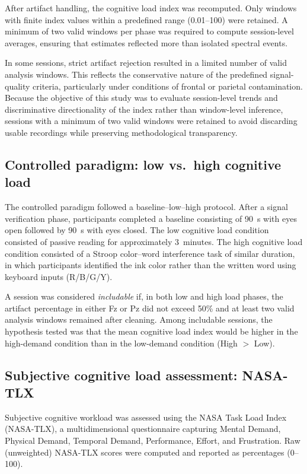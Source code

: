\documentclass[conference]{IEEEtran}
\begin{document}
After artifact handling, the cognitive load index was recomputed. Only windows with finite index values within a predefined range (0.01--100) were retained. A minimum of two valid windows per phase was required to compute session-level averages, ensuring that estimates reflected more than isolated spectral events.

In some sessions, strict artifact rejection resulted in a limited number of valid analysis windows. This reflects the conservative nature of the predefined signal-quality criteria, particularly under conditions of frontal or parietal contamination. Because the objective of this study was to evaluate session-level trends and discriminative directionality of the index rather than window-level inference, sessions with a minimum of two valid windows were retained to avoid discarding usable recordings while preserving methodological transparency.


\subsection{Controlled paradigm: low vs.\ high cognitive load}
The controlled paradigm followed a baseline--low--high protocol. After a signal verification phase, participants completed a baseline consisting of 90~s with eyes open followed by 90~s with eyes closed. The low cognitive load condition consisted of passive reading for approximately 3~minutes. The high cognitive load condition consisted of a Stroop color--word interference task of similar duration, in which participants identified the ink color rather than the written word using keyboard inputs (R/B/G/Y).

A session was considered \emph{includable} if, in both low and high load phases, the artifact percentage in either Fz or Pz did not exceed 50\% and at least two valid analysis windows remained after cleaning. Among includable sessions, the hypothesis tested was that the mean cognitive load index would be higher in the high-demand condition than in the low-demand condition (High $>$ Low).

\subsection{Subjective cognitive load assessment: NASA-TLX}
Subjective cognitive workload was assessed using the NASA Task Load Index (NASA-TLX), a multidimensional questionnaire capturing Mental Demand, Physical Demand, Temporal Demand, Performance, Effort, and Frustration. Raw (unweighted) NASA-TLX scores were computed and reported as percentages (0--100).
\end{document}
